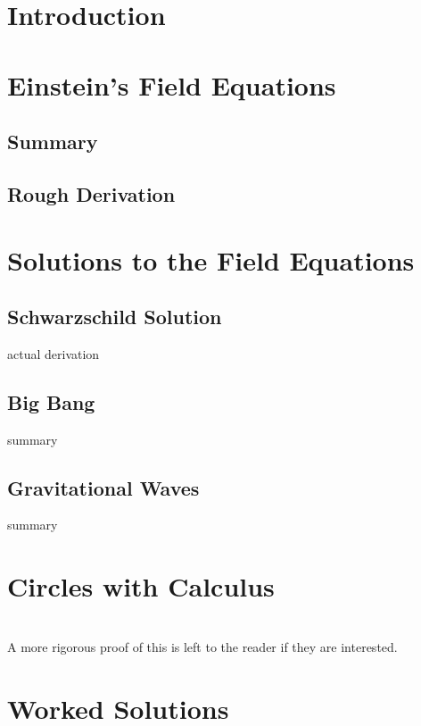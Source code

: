 \documentclass{memoir}
\begin{document}
\chapter{Introduction}

\chapter{Einstein's Field Equations}
\section{Summary}

\section{Rough Derivation}
\chapter{Solutions to the Field Equations}
\section{Schwarzschild Solution}
actual derivation
\section{Big Bang}
summary
\section{Gravitational Waves}
summary





\begin{appendices}
\chapter{Circles with Calculus}
 \\
A more rigorous proof of this is left to the reader if they are interested.
\chapter{Worked Solutions}

\end{appendices}
\end{document}

